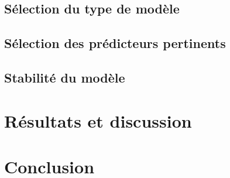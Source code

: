 \documentclass[]{article}
\begin{document}
\subsection{Sélection du type de modèle}

\subsection{Sélection des prédicteurs pertinents}

\subsection{Stabilité du modèle}

\newpage

\section{Résultats et discussion}

\newpage

\section{Conclusion}
\end{document}
